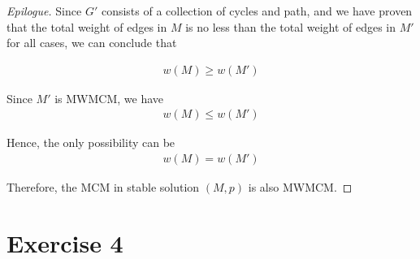 \documentclass[11pt,a4paper]{article}
\begin{document}
\begin{proof}[Epilogue]
    Since $G'$ consists of a collection of cycles
    and path, and we have proven that the total weight of edges
    in $M$ is no less than the total weight of edges in $M'$ for all cases, we
    can conclude that

    \begin{align}
        w (M) \geq w (M')
    \end{align}

    Since $M'$ is MWMCM, we have
    \begin{align}
        w (M) \leq w (M')
    \end{align}

    Hence, the only possibility can be
    \begin{align}
        w (M) = w (M')
    \end{align}

    Therefore, the MCM in stable solution $(M,p)$ is also MWMCM.
\end{proof}

\newpage
\section{Exercise 4}
\end{document}
